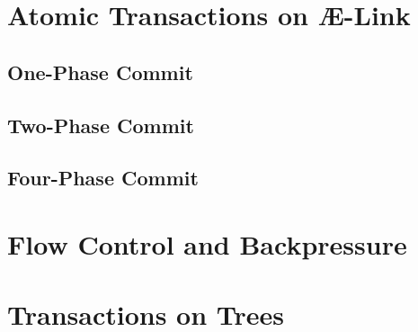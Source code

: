 \section{Atomic Transactions on Æ-Link}

\subsection {One-Phase Commit}

\subsection {Two-Phase Commit}

\subsection {Four-Phase Commit}

\section{Flow Control and Backpressure}

\section{Transactions on Trees}